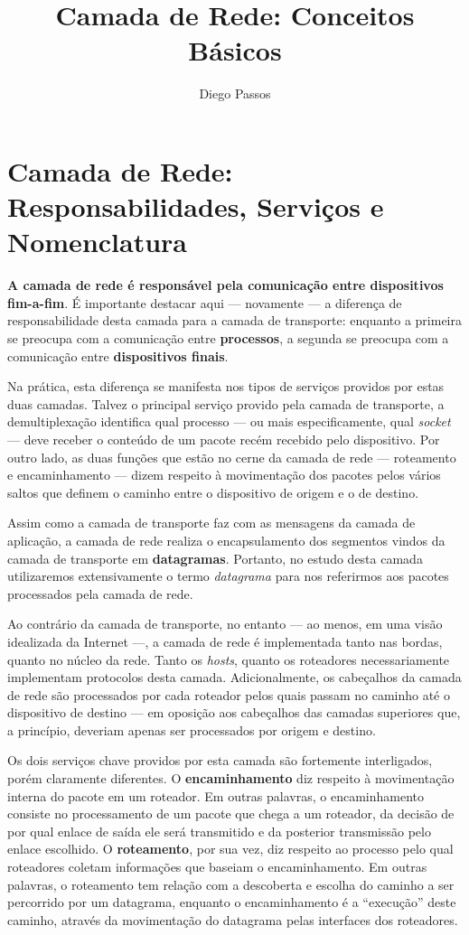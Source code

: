 \documentclass{article}
\title{Camada de Rede: Conceitos Básicos}
\author{Diego Passos}
\date{}  %
\begin{document}
\maketitle%

\section{Camada de Rede: Responsabilidades, Serviços e Nomenclatura}

\textbf{A camada de rede é responsável pela comunicação entre dispositivos fim-a-fim}. É importante destacar aqui --- novamente --- a diferença de responsabilidade desta camada para a camada de transporte: enquanto a primeira se preocupa com a comunicação entre \textbf{processos}, a segunda se preocupa com a comunicação entre \textbf{dispositivos finais}. 

Na prática, esta diferença se manifesta nos tipos de serviços providos por estas duas camadas. Talvez o principal serviço provido pela camada de transporte, a demultiplexação identifica qual processo --- ou mais especificamente, qual \textit{socket} --- deve receber o conteúdo de um pacote recém recebido pelo dispositivo. Por outro lado, as duas funções que estão no cerne da camada de rede --- roteamento e encaminhamento --- dizem respeito à movimentação dos pacotes pelos vários saltos que definem o caminho entre o dispositivo de origem e o de destino.

Assim como a camada de transporte faz com as mensagens da camada de aplicação, a camada de rede realiza o encapsulamento dos segmentos vindos da camada de transporte em \textbf{datagramas}. Portanto, no estudo desta camada utilizaremos extensivamente o termo \textit{datagrama} para nos referirmos aos pacotes processados pela camada de rede.

Ao contrário da camada de transporte, no entanto --- ao menos, em uma visão idealizada da Internet ---, a camada de rede é implementada tanto nas bordas, quanto no núcleo da rede. Tanto os \textit{hosts}, quanto os roteadores necessariamente implementam protocolos desta camada. Adicionalmente, os cabeçalhos da camada de rede são processados por cada roteador pelos quais passam no caminho até o dispositivo de destino --- em oposição aos cabeçalhos das camadas superiores que, a princípio, deveriam apenas ser processados por origem e destino.

Os dois serviços chave providos por esta camada são fortemente interligados, porém claramente diferentes. O \textbf{encaminhamento} diz respeito à movimentação interna do pacote em um roteador. Em outras palavras, o encaminhamento consiste no processamento de um pacote que chega a um roteador, da decisão de por qual enlace de saída ele será transmitido e da posterior transmissão pelo enlace escolhido. O \textbf{roteamento}, por sua vez, diz respeito ao processo pelo qual roteadores coletam informações que baseiam o encaminhamento. Em outras palavras, o roteamento tem relação com a descoberta e escolha do caminho a ser percorrido por um datagrama, enquanto o encaminhamento é a ``execução'' deste caminho, através da movimentação do datagrama pelas interfaces dos roteadores.
\end{document}
